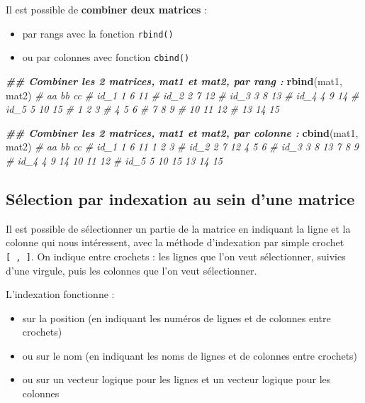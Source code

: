 \documentclass[
]{book}
\newenvironment{Shaded}{\begin{snugshade}}{\end{snugshade}}
\newcommand{\CommentTok}[1]{\textcolor[rgb]{0.56,0.35,0.01}{\textit{#1}}}
\newcommand{\DocumentationTok}[1]{\textcolor[rgb]{0.56,0.35,0.01}{\textbf{\textit{#1}}}}
\newcommand{\FunctionTok}[1]{\textcolor[rgb]{0.13,0.29,0.53}{\textbf{#1}}}
\newcommand{\NormalTok}[1]{#1}
\providecommand{\tightlist}{%
  \setlength{\itemsep}{0pt}\setlength{\parskip}{0pt}}
\begin{document}
Il est possible de \textbf{combiner deux matrices} :

\begin{itemize}
\tightlist
\item
  par rangs avec la fonction \texttt{rbind()}
\item
  ou par colonnes avec fonction \texttt{cbind()}
\end{itemize}

\begin{Shaded}
\begin{Highlighting}[]
\DocumentationTok{\#\# Combiner les 2 matrices, mat1 et mat2, par rang : }
\FunctionTok{rbind}\NormalTok{(mat1, mat2)}
\CommentTok{\#      aa bb cc}
\CommentTok{\# id\_1  1  6 11}
\CommentTok{\# id\_2  2  7 12}
\CommentTok{\# id\_3  3  8 13}
\CommentTok{\# id\_4  4  9 14}
\CommentTok{\# id\_5  5 10 15}
\CommentTok{\#       1  2  3}
\CommentTok{\#       4  5  6}
\CommentTok{\#       7  8  9}
\CommentTok{\#      10 11 12}
\CommentTok{\#      13 14 15}

\DocumentationTok{\#\# Combiner les 2 matrices, mat1 et mat2, par colonne : }
\FunctionTok{cbind}\NormalTok{(mat1, mat2)}
\CommentTok{\#      aa bb cc         }
\CommentTok{\# id\_1  1  6 11  1  2  3}
\CommentTok{\# id\_2  2  7 12  4  5  6}
\CommentTok{\# id\_3  3  8 13  7  8  9}
\CommentTok{\# id\_4  4  9 14 10 11 12}
\CommentTok{\# id\_5  5 10 15 13 14 15}
\end{Highlighting}
\end{Shaded}

\subsection{Sélection par indexation au sein d'une matrice}\label{suxe9lection-par-indexation-au-sein-dune-matrice}

Il est possible de sélectionner un partie de la matrice en indiquant la ligne et la colonne qui nous intéressent, avec la méthode d'indexation par simple crochet \texttt{{[}\ ,\ {]}}. On indique entre crochets : les lignes que l'on veut sélectionner, suivies d'une virgule, puis les colonnes que l'on veut sélectionner.

L'indexation fonctionne :

\begin{itemize}
\tightlist
\item
  sur la position (en indiquant les numéros de lignes et de colonnes entre crochets)
\item
  ou sur le nom (en indiquant les noms de lignes et de colonnes entre crochets)
\item
  ou sur un vecteur logique pour les lignes et un vecteur logique pour les colonnes
\end{itemize}
\end{document}
